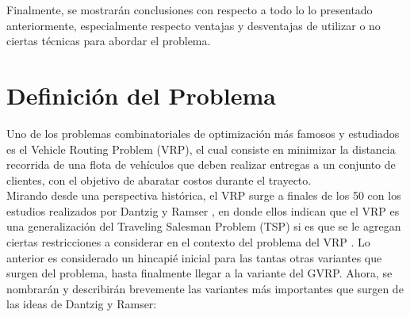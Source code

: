 \documentclass[letter, 10pt]{article}
\begin{document}
Finalmente, se mostrarán conclusiones con respecto a todo lo lo presentado anteriormente, especialmente respecto ventajas y desventajas de utilizar o no ciertas técnicas para abordar el problema.


\section{Definici\'on del Problema}
Uno de los problemas combinatoriales de optimización más famosos y estudiados es el Vehicle Routing Problem (VRP), el cual consiste en minimizar la distancia recorrida de una flota de vehículos que deben realizar entregas a un conjunto de clientes, con el objetivo de abaratar costos durante el trayecto.
\\

Mirando desde una perspectiva histórica, el VRP surge a finales de los 50 con los estudios realizados por Dantzig y Ramser \cite{LIN20141118}, en donde ellos indican que el VRP es una generalización del Traveling Salesman Problem (TSP) si es que se le agregan ciertas restricciones a considerar en el contexto del problema del VRP \cite{RePEc:inm:ormnsc:v:6:y:1959:i:1:p:80-91}. Lo anterior es considerado un hincapié inicial para las tantas otras variantes que surgen del problema, hasta finalmente llegar a la variante del GVRP. Ahora, se nombrarán y describirán brevemente las variantes más importantes que surgen de las ideas de Dantzig y Ramser:
\end{document}
